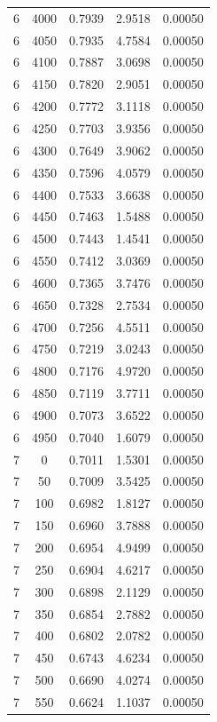 \begin{longtable}{ccccc}
    6 & 4000 & 0.7939 & 2.9518 & 0.00050 \\
    6 & 4050 & 0.7935 & 4.7584 & 0.00050 \\
    6 & 4100 & 0.7887 & 3.0698 & 0.00050 \\
    6 & 4150 & 0.7820 & 2.9051 & 0.00050 \\
    6 & 4200 & 0.7772 & 3.1118 & 0.00050 \\
    6 & 4250 & 0.7703 & 3.9356 & 0.00050 \\
    6 & 4300 & 0.7649 & 3.9062 & 0.00050 \\
    6 & 4350 & 0.7596 & 4.0579 & 0.00050 \\
    6 & 4400 & 0.7533 & 3.6638 & 0.00050 \\
    6 & 4450 & 0.7463 & 1.5488 & 0.00050 \\
    6 & 4500 & 0.7443 & 1.4541 & 0.00050 \\
    6 & 4550 & 0.7412 & 3.0369 & 0.00050 \\
    6 & 4600 & 0.7365 & 3.7476 & 0.00050 \\
    6 & 4650 & 0.7328 & 2.7534 & 0.00050 \\
    6 & 4700 & 0.7256 & 4.5511 & 0.00050 \\
    6 & 4750 & 0.7219 & 3.0243 & 0.00050 \\
    6 & 4800 & 0.7176 & 4.9720 & 0.00050 \\
    6 & 4850 & 0.7119 & 3.7711 & 0.00050 \\
    6 & 4900 & 0.7073 & 3.6522 & 0.00050 \\
    6 & 4950 & 0.7040 & 1.6079 & 0.00050 \\
    7 & 0 & 0.7011 & 1.5301 & 0.00050 \\
    7 & 50 & 0.7009 & 3.5425 & 0.00050 \\
    7 & 100 & 0.6982 & 1.8127 & 0.00050 \\
    7 & 150 & 0.6960 & 3.7888 & 0.00050 \\
    7 & 200 & 0.6954 & 4.9499 & 0.00050 \\
    7 & 250 & 0.6904 & 4.6217 & 0.00050 \\
    7 & 300 & 0.6898 & 2.1129 & 0.00050 \\
    7 & 350 & 0.6854 & 2.7882 & 0.00050 \\
    7 & 400 & 0.6802 & 2.0782 & 0.00050 \\
    7 & 450 & 0.6743 & 4.6234 & 0.00050 \\
    7 & 500 & 0.6690 & 4.0274 & 0.00050 \\
    7 & 550 & 0.6624 & 1.1037 & 0.00050 \\

\end{longtable}
